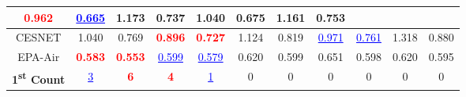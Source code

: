 \documentclass[11pt]{article}
\begin{document}
\begin{table}[htbp]
{\begin{tabular}{c cc cc cc cc cc}
\textcolor{red}{\textbf{0.962}} & \textcolor{blue}{\underline{0.665}} &
1.173 & 0.737 &
1.040 & 0.675 &
1.161 & 0.753 \\
\midrule
CESNET &
1.040 & 0.769 &
\textcolor{red}{\textbf{0.896}} & \textcolor{red}{\textbf{0.727}} &
1.124 & 0.819 &
\textcolor{blue}{\underline{0.971}} & \textcolor{blue}{\underline{0.761}} &
1.318 & 0.880 \\
\midrule
EPA-Air &
\textcolor{red}{\textbf{0.583}} & \textcolor{red}{\textbf{0.553}} &
\textcolor{blue}{\underline{0.599}} & \textcolor{blue}{\underline{0.579}} &
0.620 & 0.599 &
0.651 & 0.598 &
0.620 & 0.595 \\
\midrule
\rowcolor{red!10}
\textbf{1\textsuperscript{st} Count} &
\textcolor{blue}{\underline{3}} & \textcolor{red}{\textbf{6}} &
\textcolor{red}{\textbf{4}} & \textcolor{blue}{\underline{1}} &
0 & 0 &
0 & 0 &
0 & 0 \\
\bottomrule
\end{tabular}%
}
\end{table}
\end{document}
